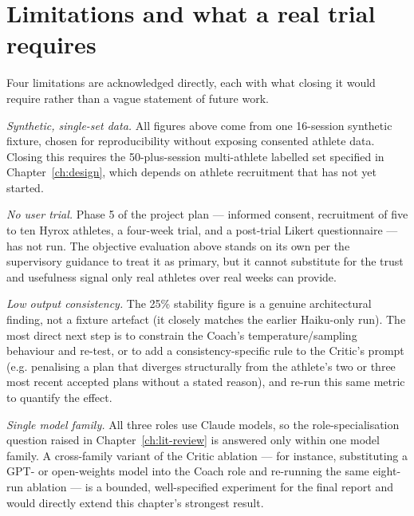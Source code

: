 \section{Limitations and what a real trial requires}
\label{sec:eval-limitations}

Four limitations are acknowledged directly, each with what closing it would require rather than a vague statement of future work.

\emph{Synthetic, single-set data.} All figures above come from one 16-session synthetic fixture, chosen for reproducibility without exposing consented athlete data. Closing this requires the 50-plus-session multi-athlete labelled set specified in Chapter~\ref{ch:design}, which depends on athlete recruitment that has not yet started.

\emph{No user trial.} Phase 5 of the project plan --- informed consent, recruitment of five to ten Hyrox athletes, a four-week trial, and a post-trial Likert questionnaire --- has not run. The objective evaluation above stands on its own per the supervisory guidance to treat it as primary, but it cannot substitute for the trust and usefulness signal only real athletes over real weeks can provide.

\emph{Low output consistency.} The 25\% stability figure is a genuine architectural finding, not a fixture artefact (it closely matches the earlier Haiku-only run). The most direct next step is to constrain the Coach's temperature/sampling behaviour and re-test, or to add a consistency-specific rule to the Critic's prompt (e.g. penalising a plan that diverges structurally from the athlete's two or three most recent accepted plans without a stated reason), and re-run this same metric to quantify the effect.

\emph{Single model family.} All three roles use Claude models, so the role-specialisation question raised in Chapter~\ref{ch:lit-review} is answered only within one model family. A cross-family variant of the Critic ablation --- for instance, substituting a GPT- or open-weights model into the Coach role and re-running the same eight-run ablation --- is a bounded, well-specified experiment for the final report and would directly extend this chapter's strongest result.
